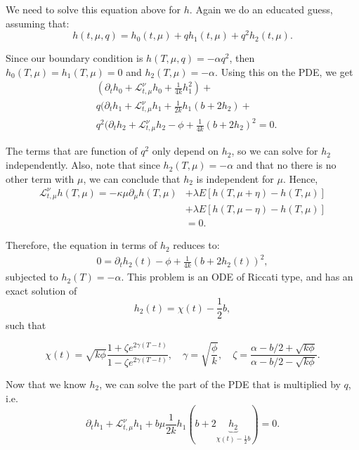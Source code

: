 We need to solve this equation above for $h$. Again we do an educated guess, assuming that:
\begin{displaymath}
	h(t,\mu,q) = h_0(t,\mu) + q h_1(t,\mu) + q^2 h_2(t,\mu).
\end{displaymath}

Since our boundary condition is $h(T,\mu,q) = - \alpha q^2$, then
$h_0(T,\mu)= h_1(T,\mu) = 0$ and $h_2(T,\mu)=-\alpha$.
Using this on the PDE, we get
\begin{align*}
  &(\partial_t h_0 + \mathcal L ^\nu_{t,\mu} h_0 + \frac{1}{4k} h_1^2 ) + \\
  &q(\partial_t h_1 + \mathcal L ^\nu_{t,\mu} h_1 + \frac{1}{2k} h_1(b+2h_2) + \\
  &q^2(\partial_t h_2 + \mathcal L ^\nu_{t,\mu} h_2 -\phi + \frac{1}{4k}(b+2h_2)^2 =0.
\end{align*}

The terms that are function of $q^2$ only depend on $h_2$,
so we can solve for $h_2$ independently.
Also, note that since $h_2(T,\mu) = -\alpha$ and that no there is
no other term with $\mu$, we can conclude that $h_2$ is independent for $\mu$.
Hence,
\begin{align*}
  \mathcal L^\nu_{t,\mu} h(T,\mu) = -\kappa \mu \partial_\mu h(T,\mu) &+
  \lambda E[ h(T,\mu+\eta) - h(T,\mu)]\\&+
	\lambda E[ h(T,\mu-\eta) - h(T,\mu)] \\
                                  &= 0.
\end{align*}

Therefore, the equation in terms of $h_2$ reduces to:
\begin{align*}
  0 = \partial_t h_2(t) - \phi + \frac{1}{4k}(b+2h_2(t))^2,
\end{align*}
subjected to $h_2(T)= -\alpha$. This problem is an ODE of Riccati type, and
has an exact solution of
\begin{displaymath}
  h_2(t) = \chi(t) - \frac{1}{2}b,
\end{displaymath}
such that

\begin{displaymath}
	\chi(t) = \sqrt{k \phi} \frac{1+\zeta e^{2\gamma(T-t)}}{1-\zeta e^{2\gamma(T-t)}}, \quad
	\gamma = \sqrt{\frac{\phi}{k}}, \quad
	\zeta = \frac{\alpha -b/2 + \sqrt{k \phi}}{\alpha -b/2 - \sqrt{k \phi}}.
\end{displaymath}

Now that we know $h_2$, we can solve the part of the PDE
that is multiplied by $q$, i.e.
\begin{displaymath}
  \partial_t h_1 + \mathcal L^\nu_{t,\mu} h_1 + b\mu
  \frac{1}{2k} h_1(b+2 \underbrace{h_2}_{\chi(t) - \frac{1}{2}b}) = 0.
\end{displaymath}

